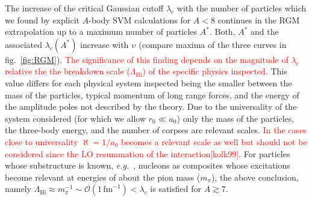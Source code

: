\documentclass[preprint,12pt]{elsarticle}
\newcommand{\largescale}{\ensuremath{\Lambda_\text{Hi}}}
\newcommand{\lc}{\ensuremath{\lambda_c}}
\newcommand{\fm}{\ensuremath{\,\text{fm}^{-1}}}
\newcommand{\red}[1]{\textcolor{red}{#1}}
\newcommand{\eg}{\textit{e.g.}~}
\newcommand{\figref}[1]{fig.~\ref{#1}}
\begin{document}
The increase of the critical Gaussian cutoff $\lc$ with the number of particles which we found by explicit $A$-body SVM calculations for $A<8$ continues in the RGM extrapolation up to a maximum number of particles $A^*$.
Both, $A^*$ and the associated $\lc(A^*)$ increase with $\upsilon$ (compare maxima of the three curves in \figref{fig:RGM}).
\red{The significance of this finding depends on the magnitude of $\lc$ relative the the breakdown scale ($\largescale$) of the specific physics inspected. }
This value differs for each physical system inspected being the smaller between the mass of the particles, typical momentum of long range forces, and the energy of the amplitude poles not described by the theory.
Due to the universality of the system considered (for which we allow $r_0\ll a_0$) only the mass of the particles, the three-body energy, and the number of corpses are relevant scales.
\red{In the cases close to universality $\aleph=1/a_0$ becomes a relevant scale as well but should not be considered since the LO resummation of the interaction[kolk99].}
For particles whose substructure is known, \eg, nucleons as composites whose excitations become relevant at energies of about the pion mass ($m_\pi$), the above conclusion, namely  \mbox{$\largescale\approx m_\pi^{-1}\sim\mathcal{O}(1\fm)<\lc$} is satisfied for $A\gtrsim7$. 

\end{document}
